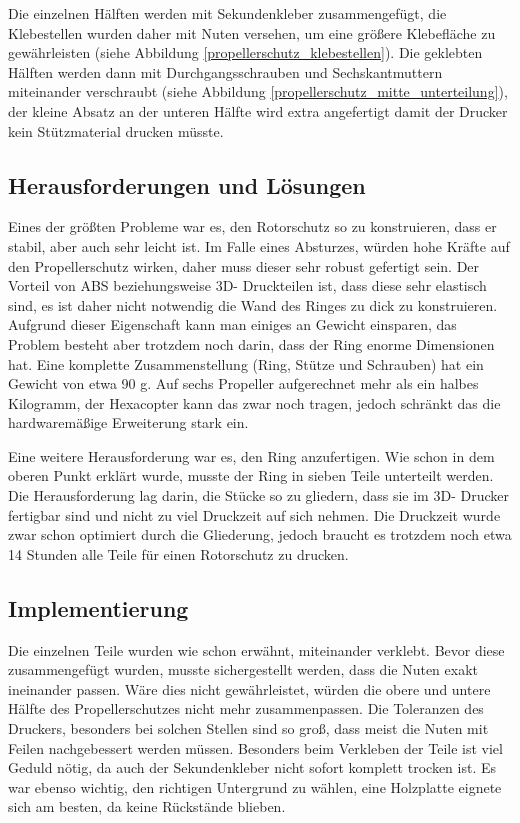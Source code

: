 	Die einzelnen Hälften  werden mit Sekundenkleber zusammengefügt, die Klebestellen wurden daher mit Nuten versehen,
	um eine größere Klebefläche zu gewährleisten (siehe Abbildung \ref{propellerschutz_klebestellen}).
	Die geklebten Hälften werden dann mit Durchgangsschrauben und Sechskantmuttern miteinander verschraubt (siehe Abbildung  \ref{propellerschutz_mitte_unterteilung}),
	der kleine Absatz an der unteren Hälfte wird extra angefertigt damit der Drucker kein Stützmaterial drucken müsste.

			\newpage

	\subsection{Herausforderungen und Lösungen}

	Eines der größten Probleme war es, den Rotorschutz so zu konstruieren, dass er stabil, aber auch sehr leicht ist.
	Im Falle eines Absturzes, würden hohe Kräfte auf den Propellerschutz wirken, daher muss dieser sehr robust gefertigt sein.
	Der Vorteil von ABS beziehungsweise 3D- Druckteilen ist, dass diese sehr elastisch sind, es ist daher nicht notwendig die Wand des Ringes zu dick zu konstruieren.
 	Aufgrund dieser Eigenschaft kann man einiges an Gewicht einsparen, das Problem besteht aber trotzdem noch darin, dass der Ring enorme Dimensionen hat.
	Eine komplette Zusammenstellung (Ring, Stütze und Schrauben) hat ein Gewicht von etwa 90 g.
	Auf sechs Propeller aufgerechnet mehr als ein halbes Kilogramm, der Hexacopter kann das zwar noch tragen, jedoch schränkt das die hardwaremäßige Erweiterung stark ein.

	Eine weitere Herausforderung war es, den Ring anzufertigen. Wie schon in dem oberen Punkt erklärt wurde, musste der Ring in sieben Teile unterteilt werden.
	Die Herausforderung lag darin, die Stücke so zu gliedern, dass sie im 3D- Drucker fertigbar sind und nicht zu viel Druckzeit auf sich nehmen.
	Die Druckzeit wurde zwar schon optimiert durch die Gliederung, jedoch braucht es trotzdem noch etwa 14 Stunden alle Teile für einen Rotorschutz zu drucken.

	\subsection{Implementierung}

Die einzelnen Teile wurden wie schon erwähnt, miteinander verklebt. Bevor diese zusammengefügt wurden, musste sichergestellt werden, dass die Nuten exakt ineinander passen.
Wäre dies nicht gewährleistet, würden die obere und untere Hälfte des Propellerschutzes nicht mehr zusammenpassen.
Die Toleranzen des Druckers, besonders bei solchen Stellen sind so groß, dass meist die Nuten mit Feilen nachgebessert werden müssen.
Besonders beim Verkleben der Teile ist viel Geduld nötig, da auch der Sekundenkleber nicht sofort komplett trocken ist.
Es war ebenso wichtig, den richtigen Untergrund zu wählen, eine Holzplatte eignete sich am besten, da keine Rückstände blieben.

